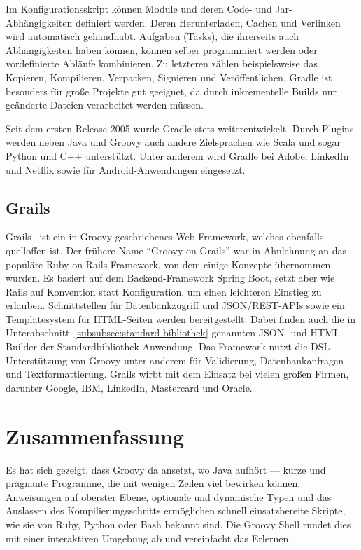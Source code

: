 \documentclass[a4paper]{article}
\begin{document}
Im Konfigurationsskript können Module und deren Code- und Jar-Abhängigkeiten definiert werden.
Deren Herunterladen, Cachen und Verlinken wird automatisch gehandhabt.
Aufgaben (Tasks), die ihrerseits auch Abhängigkeiten haben können, können selber programmiert werden oder vordefinierte Abläufe kombinieren.
Zu letzteren zählen beispielsweise das Kopieren, Kompilieren, Verpacken, Signieren und Veröffentlichen.
Gradle ist besonders für große Projekte gut geeignet, da durch inkrementelle Builds nur geänderte Dateien verarbeitet werden müssen.

Seit dem ersten Release 2005 wurde Gradle stets weiterentwickelt.
Durch Plugins werden neben Java und Groovy auch andere Zielsprachen wie Scala und sogar Python und C++ unterstützt.
Unter anderem wird Gradle bei Adobe, LinkedIn und Netflix sowie für Android-Anwendungen eingesetzt.

\subsection{Grails}\label{subsec:grails}

Grails~\cite{grails} ist ein in Groovy geschriebenes Web-Framework, welches ebenfalls quelloffen ist.
Der frühere Name ``Groovy on Grails'' war in Ahnlehnung an das populäre Ruby-on-Rails-Framework, von dem einige Konzepte übernommen wurden.
Es basiert auf dem Backend-Framework Spring Boot, setzt aber wie Rails auf Konvention statt Konfiguration, um einen leichteren Einstieg zu erlauben.
Schnittstellen für Datenbankzugriff und JSON/REST-APIs sowie ein Templatesystem für HTML-Seiten werden bereitgestellt.
Dabei finden auch die in Unterabschnitt~\ref{subsubsec:standard-bibliothek} genannten JSON- und HTML-Builder der Standardbibliothek Anwendung.
Das Framework nutzt die DSL-Unterstützung von Groovy unter anderem für Validierung, Datenbankanfragen und Textformattierung.
Grails wirbt mit dem Einsatz bei vielen großen Firmen, darunter Google, IBM, LinkedIn, Mastercard und Oracle.


\section{Zusammenfassung}\label{sec:zusammenfassung}

Es hat sich gezeigt, dass Groovy da ansetzt, wo Java aufhört --- kurze und prägnante Programme, die mit wenigen Zeilen viel bewirken können.
Anweisungen auf oberster Ebene, optionale und dynamische Typen und das Auslassen des Kompilierungsschritts ermöglichen schnell einsatzbereite Skripte, wie sie von Ruby, Python oder Bash bekannt sind.
Die Groovy Shell rundet dies mit einer interaktiven Umgebung ab und vereinfacht das Erlernen.
\end{document}
